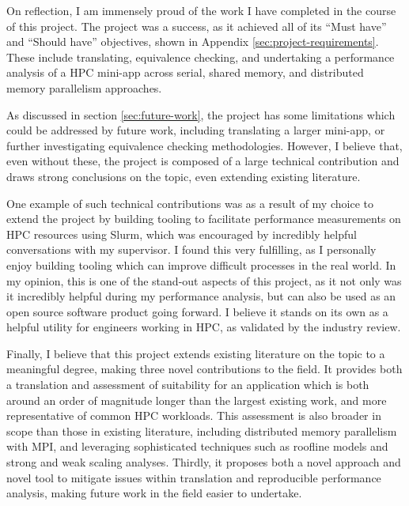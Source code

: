 On reflection, I am immensely proud of the work I have completed in the course of this project. The project was a success, as it achieved all of its ``Must have'' and ``Should have'' objectives, shown in Appendix \ref{sec:project-requirements}. These include translating, equivalence checking, and undertaking a performance analysis of a \acrshort{HPC} \acrshort{mini-app} across serial, shared memory, and distributed memory parallelism approaches.

As discussed in section \ref{sec:future-work}, the project has some limitations which could be addressed by future work, including translating a larger \acrshort{mini-app}, or further investigating equivalence checking methodologies. However, I believe that, even without these, the project is composed of a large technical contribution and draws strong conclusions on the topic, even extending existing literature.

One example of such technical contributions was as a result of my choice to extend the project by building tooling to facilitate performance measurements on \acrshort{HPC} resources using Slurm, which was encouraged by incredibly helpful conversations with my supervisor. I found this very fulfilling, as I personally enjoy building tooling which can improve difficult processes in the real world. In my opinion, this is one of the stand-out aspects of this project, as it not only was it incredibly helpful during my performance analysis, but can also be used as an open source software product going forward. I believe it stands on its own as a helpful utility for engineers working in \acrshort{HPC}, as validated by the industry review.

Finally, I believe that this project extends existing literature on the topic to a meaningful degree, making three novel contributions to the field. It provides both a translation and assessment of suitability for an application which is both around an order of magnitude longer than the largest existing work, and more representative of common \acrshort{HPC} workloads. This assessment is also broader in scope than those in existing literature, including distributed memory parallelism with MPI, and leveraging sophisticated techniques such as roofline models and strong and weak scaling analyses. Thirdly, it proposes both a novel approach and novel tool to mitigate issues within translation and reproducible performance analysis, making future work in the field easier to undertake.


